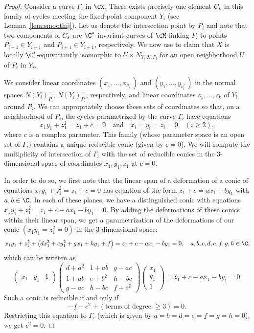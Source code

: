 \documentclass[11pt]{amsart}
\numberwithin{equation}{section}
\theoremstyle{definition}
\theoremstyle{remark}
\begin{document}
\begin{proof}
Consider a curve $\Gamma_i$ in $\CX$. There exists precisely one element $C_{\mbox{\scriptsize{s}}}$ in this family of cycles meeting the fixed-point component $Y_i$ (see Lemma~\ref{lem:smoothij}). Let us denote the intersection point by $P_i$ and note that two components of $C_{\mbox{\scriptsize{s}}}$ are $\C^*$-invariant curves of $\cM$ linking $P_i$ to points $P_{i-1}\in Y_{i-1}$ and  $P_{i+1}\in Y_{i+1}$, respectively. We now use \cite[Theorem~2.5]{BB} to claim that $X$ is locally $\C^*$-equivariantly isomorphic to $U\times {N_{Y_i|X,P_i}}$ for an open neighborhood $U$ of $P_i$ in $Y_i$. 

We consider linear coordinates $(x_1,\dots,x_{\nu_i^-})$ and $(y_1,\dots,y_{\nu_i^+})$  in the normal spaces $N(Y_i)_{P_i}^-$, $N(Y_i)^+_{P_i}$, respectively, and linear coordinates $z_1,\dots,z_k$  of $Y_i$ around $P_i$. We can appropriately choose these sets of coordinates so that, on a neighborhood of $P_i$, the cycles parametrized by the curve $\Gamma_i$ have equations
\[
x_1y_1+z_1^2=z_1+c=0\quad\text{and}\quad x_i=y_i=z_i=0 \quad (i\geq 2),
\] 
where $c$ is a complex parameter. This family (whose parameter space is an open set of $\Gamma_i$) contains a unique reducible conic (given by $c=0$). We will compute the multiplicity of intersection of $\Gamma_i$ with the set of reducible conics in the $3$-dimensional space of coordinates $x_1,y_1,z_1$ at $c=0$.

 In order to do so, we first note that the linear span of a deformation of a conic of equations $x_1y_1+z_1^2=z_1+c=0$ has equation of the form $z_1+c=ax_1+by_1$ with $a,b\in \C$. In each of these planes, we have a distinguished conic with equations $x_1y_1+z_1^2=z_1+c-ax_1-by_1=0$. By adding the deformations of these conics within their linear span, we get a parametrization of the deformations of our conic $(x_1y_1=z_1^2=0)$ in the $3$-dimensional space:
\[
x_1y_1+z_1^2+\left(dx_1^2+ey_1^2+gx_1+hy_1+f\right)=z_1+c-ax_1-by_1=0,\quad a,b,c,d,e,f,g,h\in \C,
\]
which can be written as 
\[
\begin{pmatrix}x_1&y_1&1\end{pmatrix}
\begin{pmatrix}
d+a^2 & 1+ab & g-ac\\
1+ab & e+b^2 & h-bc\\
g-ac & h-bc & f+c^2
\end{pmatrix}
\begin{pmatrix}x_1\\y_1\\1\end{pmatrix}=z_1+c-ax_1-by_1=0.\]
Such a conic is reducible if and only if
\[
-f-c^2+(\mbox{terms of degree $\geq 3$})=0. 
\]
Restricting this equation to  $\Gamma_i$ (which is given by $a=b=d=e=f=g=h=0$), we get $c^2=0$.
\end{proof}
\end{document}
